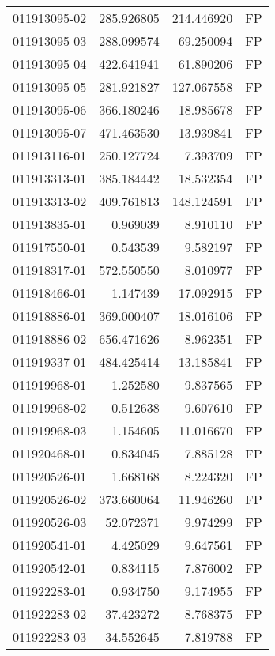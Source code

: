 \begin{tabular}{lrrl}
011913095-02 &  285.926805 &     214.446920 &   FP \\
011913095-03 &  288.099574 &      69.250094 &   FP \\
011913095-04 &  422.641941 &      61.890206 &   FP \\
011913095-05 &  281.921827 &     127.067558 &   FP \\
011913095-06 &  366.180246 &      18.985678 &   FP \\
011913095-07 &  471.463530 &      13.939841 &   FP \\
011913116-01 &  250.127724 &       7.393709 &   FP \\
011913313-01 &  385.184442 &      18.532354 &   FP \\
011913313-02 &  409.761813 &     148.124591 &   FP \\
011913835-01 &    0.969039 &       8.910110 &   FP \\
011917550-01 &    0.543539 &       9.582197 &   FP \\
011918317-01 &  572.550550 &       8.010977 &   FP \\
011918466-01 &    1.147439 &      17.092915 &   FP \\
011918886-01 &  369.000407 &      18.016106 &   FP \\
011918886-02 &  656.471626 &       8.962351 &   FP \\
011919337-01 &  484.425414 &      13.185841 &   FP \\
011919968-01 &    1.252580 &       9.837565 &   FP \\
011919968-02 &    0.512638 &       9.607610 &   FP \\
011919968-03 &    1.154605 &      11.016670 &   FP \\
011920468-01 &    0.834045 &       7.885128 &   FP \\
011920526-01 &    1.668168 &       8.224320 &   FP \\
011920526-02 &  373.660064 &      11.946260 &   FP \\
011920526-03 &   52.072371 &       9.974299 &   FP \\
011920541-01 &    4.425029 &       9.647561 &   FP \\
011920542-01 &    0.834115 &       7.876002 &   FP \\
011922283-01 &    0.934750 &       9.174955 &   FP \\
011922283-02 &   37.423272 &       8.768375 &   FP \\
011922283-03 &   34.552645 &       7.819788 &   FP \\

\end{tabular}
